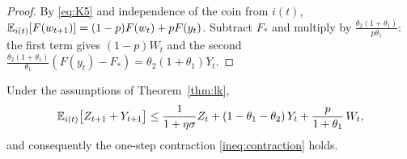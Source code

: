 \begin{proof}
By \eqref{eq:K5} and independence of the coin from $i(t)$, $\mathbb{E}_{i(t)}[F(w_{t+1})]=(1-p)F(w_t)+pF(y_t)$. Subtract $F_\ast$ and multiply by $\frac{\theta_2(1+\theta_1)}{p\theta_1}$: the first term gives $(1-p)W_t$ and the second $\frac{\theta_2(1+\theta_1)}{\theta_1}(F(y_t)-F_\ast)=\theta_2(1+\theta_1)Y_t$.
\end{proof}

\begin{lemma}\label{lem:L5}
Under the assumptions of Theorem~\ref{thm:lk},
\begin{equation}\label{ineq:zy-step}
\mathbb{E}_{i(t)}\big[Z_{t+1}+Y_{t+1}\big]\le\frac1{1+\eta\sigma}Z_t+(1-\theta_1-\theta_2)\,Y_t+\frac p{1+\theta_1}\,W_t ,
\end{equation}
and consequently the one-step contraction \eqref{ineq:contraction} holds.
\end{lemma}

